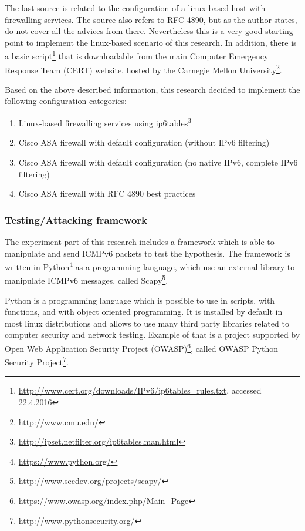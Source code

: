 \documentclass[12pt]{article}
\begin{document}
The last source is related to the configuration of a linux-based host with firewalling services. The source also refers to RFC 4890, but as the author states, do not cover all the advices from there. Nevertheless this is a very good starting point to implement the linux-based scenario of this research\cite{ip6tablesGiobbi}. In addition, there is a basic script\footnote{\url{http://www.cert.org/downloads/IPv6/ip6tables_rules.txt}, accessed 22.4.2016} that is downloadable from the main Computer Emergency Response Team (CERT) website, hosted by the Carnegie Mellon University\footnote{\url{http://www.cmu.edu/}}. 

Based on the above described information, this research decided to implement the following configuration categories:
\vspace{-10pt}
\begin{enumerate}[noitemsep,topsep=0pt,partopsep=0pt]
 \item Linux-based firewalling services using ip6tables\footnote{\url{http://ipset.netfilter.org/ip6tables.man.html}}
 \item Cisco ASA firewall with default configuration (without IPv6 filtering)
 \item Cisco ASA firewall with default configuration (no native IPv6, complete IPv6 filtering)
 \item Cisco ASA firewall with RFC 4890 best practices
\end{enumerate}


\subsubsection{Testing/Attacking framework}
\label{subsub:framework}

The experiment part of this research includes a framework which is able to manipulate and send ICMPv6 packets to test the hypothesis. The framework is written in Python\footnote{\url{https://www.python.org/}} as a programming language, which use an external library to manipulate ICMPv6 messages, called Scapy\footnote{\url{http://www.secdev.org/projects/scapy/}}.

Python is a programming language which is possible to use in scripts, with functions, and with object oriented programming. It is installed by default in most linux distributions and allows to use many third party libraries related to computer security and network testing. Example of that is a project supported by Open Web Application Security Project (OWASP)\footnote{\url{https://www.owasp.org/index.php/Main_Page}}, called OWASP Python Security Project\footnote{\url{http://www.pythonsecurity.org/}}.
\end{document}
